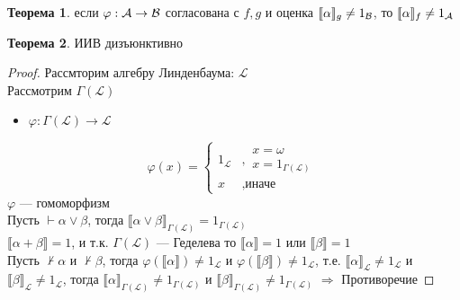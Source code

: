 \documentclass[english]{article}
\theoremstyle{plain}
\theoremstyle{remark}
\theoremstyle{definition}
\newtheorem{theorem}{Теорема}[section]
\begin{document}
\begin{theorem}
если \(\varphi: \mathcal{A} \to \mathcal{B}\) согласована с \(f, g\) и оценка \(\llbracket \alpha \rrbracket_g \neq 1_{\mathcal{B}}\), то \(\llbracket \alpha \rrbracket_f \neq 1_{\mathcal{A}}\)
\end{theorem}
\begin{theorem}
ИИВ дизъюнктивно
\end{theorem}
\begin{proof}
Рассмторим алгебру Линденбаума: \(\mathcal{L}\) \\
Рассмотрим \(\Gamma(\mathcal{L})\) \\
\begin{itemize}
\item \(\varphi: \Gamma(\mathcal{L}) \to \mathcal{L}\)
\end{itemize}
\[ \varphi(x) = \begin{cases}1_\mathcal{L} & ,\substack{x =\omega \\ x = 1_{\Gamma(\mathcal{L})}} \\ x & , \text{иначе}\end{cases} \] 
\(\varphi\) --- гомоморфизм \\
Пусть \(\vdash \alpha \vee \beta\), тогда \(\llbracket \alpha \vee \beta \rrbracket_{\Gamma(\mathcal{L})} = 1_{\Gamma(\mathcal{L})}\) \\
\(\llbracket \alpha + \beta \rrbracket = 1\), и т.к. \(\Gamma(\mathcal{L})\) --- Геделева то \(\llbracket \alpha \rrbracket = 1\) или \(\llbracket \beta \rrbracket = 1\) \\
Пусть \(\not \vdash \alpha\) и \(\not \vdash \beta\), тогда \(\varphi(\llbracket \alpha \rrbracket) \neq 1_\mathcal{L}\) и \(\varphi(\llbracket \beta \rrbracket) \neq 1_\mathcal{L}\), т.е. \(\llbracket \alpha \rrbracket_\mathcal{L} \neq 1_\mathcal{L}\) и \(\llbracket \beta \rrbracket_\mathcal{L} \neq 1_\mathcal{L}\), тогда \(\llbracket \alpha \rrbracket_{\Gamma(\mathcal{L})} \neq 1_{\Gamma(\mathcal{L})}\) и \(\llbracket \beta \rrbracket_{\Gamma(\mathcal{L})} \neq 1_{\Gamma(\mathcal{L})}\) \(\Rightarrow\) Противоречие
\end{proof}
\end{document}
